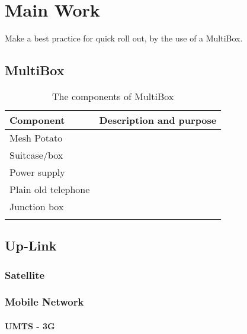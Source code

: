 \chapter{Main Work}
\label{chp:quickrollout} 

Make a best practice for quick roll out, by the use of a MultiBox. 

\section{MultiBox}


\begin{center}
\begin{table}[!ht]
\caption{\label{tab:components}The components of MultiBox}
    \begin{tabular}{ | l | p{9cm} |}
    \hline
    \textbf{Component} & \textbf{Description and purpose} \\ 
    \hline
    Mesh Potato &  \\ 
    \hline
    Suitcase/box &   \\ 
    \hline
    Power supply & \\
    \hline
    Plain old telephone & \\
	\hline
	Junction box & \\
	\hline
	 & \\
	\hline
    \end{tabular}
   \end{table}
\end{center}


\section{Up-Link}
\subsection{Satellite}


\subsection{Mobile Network}

\subsubsection{UMTS - 3G}
